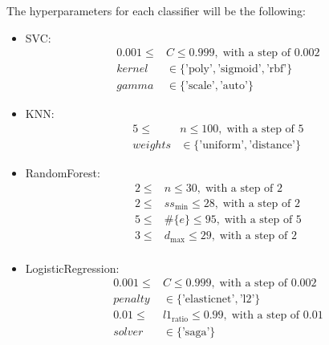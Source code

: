 \documentclass[10pt]{IEEEtran}
\begin{document}
The hyperparameters for each classifier will be the following:
\begin{itemize}
  \item SVC:
    \begin{equation*}
      \begin{aligned}
        0.001 \leq &C \leq 0.999,\; \text{with a step of 0.002}\\
           kernel &\in \{ \text{'poly'}, \text{'sigmoid'}, \text{'rbf'} \}\\
           gamma  &\in \{ \text{'scale'}, \text{'auto'} \}
      \end{aligned}
    \end{equation*}
  \item KNN:
    \begin{equation*}
      \begin{aligned}
        5 \leq  &n \leq 100,\; \text{with a step of 5}\\
           weights &\in \{ \text{'uniform'}, \text{'distance'} \}
      \end{aligned}
    \end{equation*}
  \item RandomForest:
    \begin{equation*}
      \begin{aligned}
          2 \leq  &n        \leq 30, \; \text{with a step of 2}\\
          2 \leq  &ss_\text{min} \leq 28, \; \text{with a step of 2}\\
          5 \leq  &\#\{e\}  \leq 95, \; \text{with a step of 5}\\
          3 \leq  &d_\text{max}  \leq 29, \; \text{with a step of 2}\\
      \end{aligned}
    \end{equation*}
  \item LogisticRegression:
    \begin{equation*}
      \begin{aligned}
        0.001 \leq &C \leq 0.999,\; \text{with a step of 0.002}\\
           penalty &\in \{ \text{'elasticnet'}, \text{'l2'} \}\\
        0.01 \leq &l1_\text{ratio} \leq 0.99,\; \text{with a step of 0.01}\\
           solver &\in \{ \text{'saga'} \}
      \end{aligned}
    \end{equation*}
\end{itemize}
\end{document}

